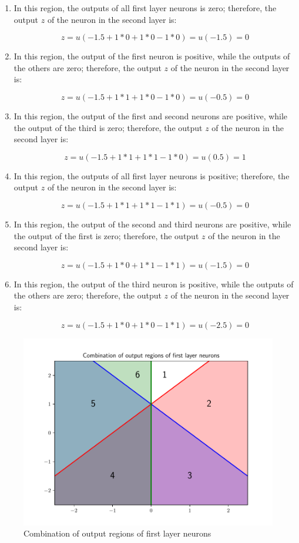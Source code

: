 \documentclass[letterpaper,headings=standardclasses]{scrartcl}
\begin{document}
\begin{enumerate}

\item In this region, the outputs of all first layer neurons is zero; therefore, the output $z$ of the neuron in the second layer is:

$$ z = u(-1.5 + 1 * 0 + 1 * 0 - 1 * 0) = u(-1.5) = 0 $$

\item In this region, the output of the first neuron is positive, while the outputs of the others are zero; therefore, the output $z$ of the neuron in the second layer is:

$$ z = u(-1.5 + 1 * 1 + 1 * 0 - 1 * 0) = u(-0.5) = 0 $$

\item In this region, the output of the first and second neurons are positive, while the output of the third is zero; therefore, the output $z$ of the neuron in the second layer is:

$$ z = u(-1.5 + 1 * 1 + 1 * 1 - 1 * 0) = u(0.5) = 1 $$

\item In this region, the outputs of all first layer neurons is positive; therefore, the output $z$ of the neuron in the second layer is:

$$ z = u(-1.5 + 1 * 1 + 1 * 1 - 1 * 1) = u(-0.5) = 0 $$

\item In this region, the output of the second and third neurons are positive, while the output of the first is zero; therefore, the output $z$ of the neuron in the second layer is:

$$ z = u(-1.5 + 1 * 0 + 1 * 1 - 1 * 1) = u(-1.5) = 0 $$

\item In this region, the output of the third neuron is positive, while the outputs of the others are zero; therefore, the output $z$ of the neuron in the second layer is:

$$ z = u(-1.5 + 1 * 0 + 1 * 0 - 1 * 1) = u(-2.5) = 0 $$

\end{enumerate}

\begin{figure}
\centering
\includegraphics[width=0.7\linewidth]{first_layer_out_all.pdf}
\caption{Combination of output regions of first layer neurons}
\end{figure}
\end{document}
